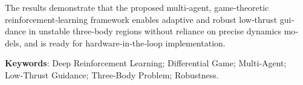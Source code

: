 \begin{latin}
The results demonstrate that the proposed multi‑agent, game‑theoretic reinforcement‑learning framework enables adaptive and robust low‑thrust guidance in unstable three‑body regions without reliance on precise dynamics models, and is ready for hardware‑in‑the‑loop implementation.

	
	\bigskip\noindent\textbf{Keywords}:
	Deep Reinforcement Learning; Differential Game; Multi‑Agent; Low‑Thrust Guidance; Three‑Body Problem; Robustness.
\end{latin}

\newpage